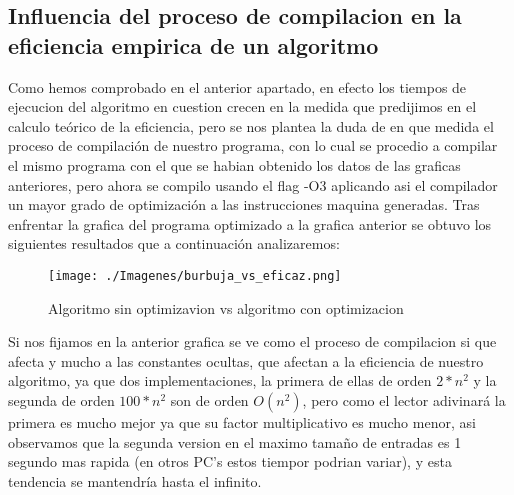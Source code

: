 \subsection{Influencia del proceso de compilacion en la eficiencia empirica de un algoritmo}
Como hemos comprobado en el anterior apartado, en efecto los tiempos de ejecucion del algoritmo en cuestion crecen en la medida que predijimos en el calculo teórico de la eficiencia, pero se nos plantea la duda de en que medida el proceso de compilación de nuestro programa, con lo cual se procedio a compilar el mismo programa con el que se habian obtenido los datos de las graficas anteriores, pero ahora se compilo usando el flag -O3 aplicando asi el compilador un mayor grado de optimización a las instrucciones maquina generadas. Tras enfrentar la grafica del programa optimizado a la grafica anterior se obtuvo los siguientes resultados que a continuación analizaremos:

\begin{figure}[ht]
  \centering
  \texttt{[image: ./Imagenes/burbuja\_vs\_eficaz.png]}
  \caption{Algoritmo sin optimizavion vs algoritmo con optimizacion}
\end{figure}

Si nos fijamos en la anterior grafica se ve como el proceso de compilacion si que afecta y mucho a las constantes ocultas, que afectan a la eficiencia de nuestro algoritmo, ya que dos implementaciones, la primera de ellas de orden $2*n^{2}$ y la segunda de orden $100*n^{2}$ son de orden $O(n^{2})$, pero como el lector adivinará la primera es mucho mejor ya que su factor multiplicativo es mucho menor, asi observamos que la segunda version en el maximo tamaño de entradas es 1 segundo mas rapida (en otros PC's estos tiempor podrian variar), y esta tendencia se mantendría hasta el infinito.